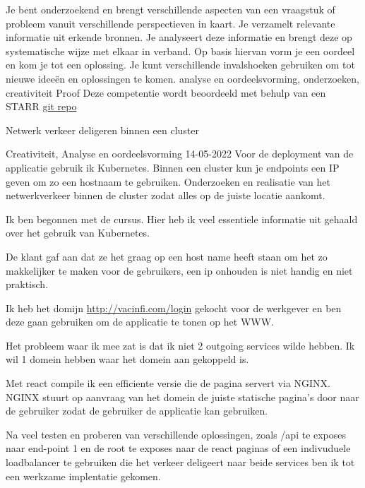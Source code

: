 \competentie
{%
	\competentieformulier
	{%
		Je bent onderzoekend en brengt verschillende
		aspecten van een vraagstuk of probleem vanuit
		verschillende perspectieven in kaart. Je verzamelt
		relevante informatie uit erkende bronnen. Je
		analyseert deze informatie en brengt deze op
		systematische wijze met elkaar in verband. Op basis
		hiervan vorm je een oordeel en kom je tot een
		oplossing. Je kunt verschillende invalshoeken
		gebruiken om tot nieuwe ideeën en oplossingen te
		komen.
	}
	{%
		analyse en
		oordeelsvorming,
		onderzoeken,
		creativiteit
	}
	{%
		Proof
	}
	{%
		Deze competentie wordt beoordeeld met behulp van een STARR
	}
	{%
		\href{https://github.com/aladante/product_inventaris}{git repo}
	}
}
{%
	\bewijs
	{%
		Netwerk verkeer deligeren binnen een cluster
	}
	{%
		\starr
		{%
			Creativiteit,
			Analyse en
			oordeelsvorming
		}
		{%
			14-05-2022
		}
		{%
			Voor de deployment van de applicatie gebruik ik Kubernetes.
			Binnen een cluster kun je endpoints een IP geven om zo een hostnaam te gebruiken.
		}
		{%
			Onderzoeken en realisatie van het netwerkverkeer binnen de cluster zodat alles op de juiste locatie aankomt.
		}
		{%
			Ik ben begonnen met de cursus. Hier heb ik veel essentiele informatie uit gehaald over het gebruik van Kubernetes.

			De klant gaf aan dat ze het graag op een host name heeft staan om het zo makkelijker te maken voor de gebruikers, een ip onhouden is niet handig en niet praktisch.

			Ik heb het domijn \href{http://vacinfi.com/login}{http://vacinfi.com/login} gekocht voor de werkgever en ben deze gaan gebruiken om de applicatie te tonen op het WWW.

			Het probleem waar ik mee zat is dat ik niet 2 outgoing services wilde hebben.
			Ik wil 1 domein hebben waar het domein aan gekoppeld is.

			Met react compile ik een efficiente versie die de pagina servert via NGINX.
			NGINX stuurt op aanvraag van het domein de juiste statische pagina's door naar de gebruiker zodat de gebruiker de applicatie kan gebruiken.

			Na veel testen en proberen van verschillende oplossingen, zoals /api te exposes naar end-point 1 en de root te exposes naar de react paginas of een indivuduele loadbalancer te gebruiken die het verkeer deligeert naar beide services ben ik tot een werkzame implentatie gekomen.

}}}
